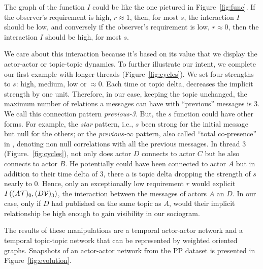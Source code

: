 \documentclass[a4paper,twoside]{article}
\newcommand{\V}{\mathcal{V}}
\begin{document}


The graph of the function $I$ could be like the one pictured in Figure~\ref{fig:func}.  If the observer's requirement is high, $r\approx{} 1$, then, for most $s$, the interaction $I$ should be low, and conversely if the observer's requirement is low, $r\approx{} 0$, then the interaction $I$ should be high, for most $s$.

We care about this interaction because it's based on its value that we display the actor-actor or topic-topic dynamics.  To further illustrate our intent, we complete our first example with longer threads (Figure~\ref{fig:cycles}).  We set four strengths to $s$: high, medium, low or $\approx 0$.  Each time or topic delta, decreases the implicit strength by one unit.  Therefore, in our case,  keeping the topic unchanged, the maximum number of relations a messages can have with ``previous'' messages is 3.  We call this connection pattern \emph{previous-3}.  But, the $s$ function could have other forms. For example, the \emph{star} pattern, i.e., $s$ been strong for the initial message but null for the others; or the \emph{previous-}$\infty$ pattern, also called ``total co-presence'' in \cite{Wise2017}, denoting non null correlations with all the previous messages.
In thread 3 (Figure.~\ref{fig:cycles}), not only does actor $D$ connects to actor $C$ but he also connects to actor $B$.  He potentially could have been connected to actor $A$ but in addition to their time delta of 3,  there a is topic delta dropping the strength of $s$ nearly to 0.  Hence, only an exceptionally low requirement $r$ would explicit $I\left ((A\T)_0,(D\V)_3 \right )$, the interaction between the messages of actors $A$ an $D$.   In our case, only if $D$ had published on the same topic as $A$, would their implicit relationship be high enough to gain visibility in our sociogram.

The results of these manipulations are a temporal actor-actor network and a temporal topic-topic network that can be represented by weighted oriented graphs.  Snapshots of an actor-actor network from the PP dataset is presented in Figure~\ref{fig:evolution}.
\end{document}
